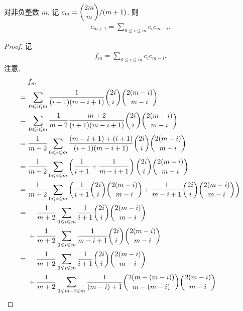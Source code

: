 \documentclass[../libro.tex]{subfiles}
\begin{document}
\begin{theorem}
    对非负整数 \(m\),
    记 \(c_m = \dbinom{2m}{m} / (m+1)\).
    则
    \begin{align*}
        c_{m+1} = \sum_{0 \leq i \leq m} {c_i c_{m-i}}.
    \end{align*}
\end{theorem}

\begin{proof}
    记
    \begin{align*}
        f_m = \sum_{0 \leq i \leq m} {c_i c_{m-i}}.
    \end{align*}
    注意,
    \begin{align*}
        &
        f_m
        \\
        = {} &
        \sum_{0 \leq i \leq m} {\frac{1}{(i+1)(m-i+1)}
        \dbinom{2i}{i} \dbinom{2(m-i)}{m-i}}
        \\
        = {} &
        \sum_{0 \leq i \leq m} {\frac{1}{m+2}
            \frac{m+2}{(i+1)(m-i+1)}
        \dbinom{2i}{i} \dbinom{2(m-i)}{m-i}}
        \\
        = {} &
        \frac{1}{m+2} \sum_{0 \leq i \leq m} {
            \frac{(m-i+1)+(i+1)}{(i+1)(m-i+1)}
        \dbinom{2i}{i} \dbinom{2(m-i)}{m-i}}
        \\
        = {} &
        \frac{1}{m+2} \sum_{0 \leq i \leq m} {
            \left(\frac{1}{i+1} + \frac{1}{m-i+1}\right)
        \dbinom{2i}{i} \dbinom{2(m-i)}{m-i}}
        \\
        = {} &
        \frac{1}{m+2} \sum_{0 \leq i \leq m} {
            \left(\frac{1}{i+1}
                \dbinom{2i}{i} \dbinom{2(m-i)}{m-i}
                + \frac{1}{m-i+1}
            \dbinom{2i}{i} \dbinom{2(m-i)}{m-i}\right)
        }
        \\
        = {} &
        \hphantom{{} + {}}
        \frac{1}{m+2} \sum_{0 \leq i \leq m} {
            \frac{1}{i+1} \dbinom{2i}{i} \dbinom{2(m-i)}{m-i}
        }
        \\
        &
        {} + \frac{1}{m+2} \sum_{0 \leq i \leq m} {
            \frac{1}{m-i+1} \dbinom{2i}{i} \dbinom{2(m-i)}{m-i}
        }
        \\
        = {} &
        \hphantom{{} + {}}
        \frac{1}{m+2} \sum_{0 \leq i \leq m} {
            \frac{1}{i+1} \dbinom{2i}{i} \dbinom{2(m-i)}{m-i}
        }
        \\
        &
        {} + \frac{1}{m+2} \sum_{0 \leq m-i \leq m} {
            \frac{1}{(m-i)+1} \dbinom{2(m-(m-i))}{m-(m-i)} \dbinom{2(m-i)}{m-i}
        }

\end{align*}
\end{proof}
\end{document}
